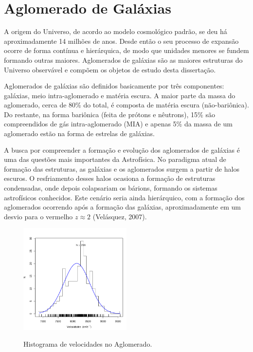 
\chapter{Aglomerado de Galáxias}
A origem do Universo, de acordo ao modelo cosmológico padrão, se deu há aproximadamente 14 milhões de anos. Desde então o seu processo de expansão ocorre de forma contínua e hierárquica, de modo que unidades menores se fundem formando outras maiores. Aglomerados de galáxias são as maiores estruturas do Universo observável e compõem os objetos de estudo desta dissertação.  

Aglomerados de galáxias são definidos basicamente por três componentes: galáxias, meio intra-aglomerado e matéria escura. A maior parte da massa do aglomerado, cerca de 80\% do total, é composta de matéria escura (não-bariônica). Do restante, na forma bariônica (feita de prótons e nêutrons), 15\% são compreendidos de gás intra-aglomerado (MIA) e apenas 5\% da massa de um aglomerado estão na forma de estrelas de galáxias.

A busca por compreender a formação e evolução dos aglomerados de galáxias é uma das questões mais importantes da Astrofísica. No paradigma atual de formação das estruturas, as galáxias e os aglomerados surgem a partir de halos escuros. O resfriamento desses halos ocasiona a formação de estruturas condensadas, onde depois colapsariam os bárions, formando  os sistemas astrofísicos conhecidos. Este cenário seria ainda hierárquico, com a formação dos aglomerados ocorrendo após a formação das galáxias, aproximadamente em um desvio para o vermelho $z \approx 2$ (Velásquez, 2007).
\begin{figure}[!htb]
	\centering
	\caption{Histograma de velocidades no Aglomerado.}
	\includegraphics[width=0.5\textwidth]{04-figuras/10043dist}
	\label{fig1}
\end{figure}

